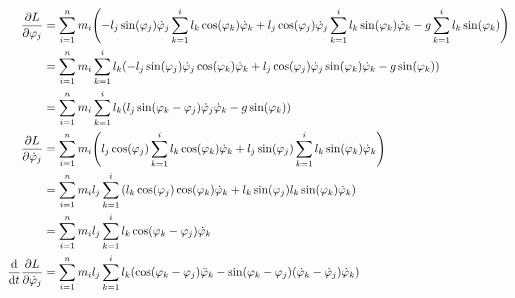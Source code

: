 \documentclass{article}
\renewcommand{\phi}{\varphi}
\begin{document}
\begin{align*}
  \pdv{L}{\phi_j} &= \sum_{i=1}^n m_i \pqty{-l_j \sin(\phi_j) \dot\phi_j \sum_{k=1}^i l_k \cos(\phi_k) \dot\phi_k + l_j \cos(\phi_j) \dot\phi_j \sum_{k=1}^i l_k \sin(\phi_k) \dot\phi_k - g \sum_{k=1}^i l_k \sin(\phi_k)} \\
                  &= \sum_{i=1}^n m_i \sum_{k=1}^i l_k \pqty{-l_j \sin(\phi_j) \dot\phi_j \cos(\phi_k) \dot\phi_k + l_j \cos(\phi_j) \dot\phi_j \sin(\phi_k) \dot\phi_k - g \sin(\phi_k)} \\
                  &= \sum_{i=1}^n m_i \sum_{k=1}^i l_k \pqty{l_j \sin(\phi_k - \phi_j) \dot\phi_j \dot\phi_k - g \sin(\phi_k)} \\
  \pdv{L}{\dot\phi_j} &= \sum_{i=1}^n m_i \pqty{l_j \cos(\phi_j) \sum_{k=1}^i l_k \cos(\phi_k) \dot\phi_k + l_j \sin(\phi_j) \sum_{k=1}^i l_k \sin(\phi_k) \dot\phi_k} \\
                      &= \sum_{i=1}^n m_i l_j \sum_{k=1}^i \pqty{l_k \cos(\phi_j) \cos(\phi_k) \dot\phi_k + l_k \sin(\phi_j) l_k \sin(\phi_k) \dot\phi_k} \\
                      &= \sum_{i=1}^n m_i l_j \sum_{k=1}^i l_k \cos(\phi_k - \phi_j) \dot\phi_k \\
  \dv{t} \pdv{L}{\dot\phi_j} &= \sum_{i=1}^n m_i l_j \sum_{k=1}^i l_k \pqty{\cos(\phi_k - \phi_j) \ddot\phi_k - \sin(\phi_k - \phi_j)(\dot\phi_k - \dot\phi_j)\dot\phi_k} \\
\end{align*}
\end{document}
